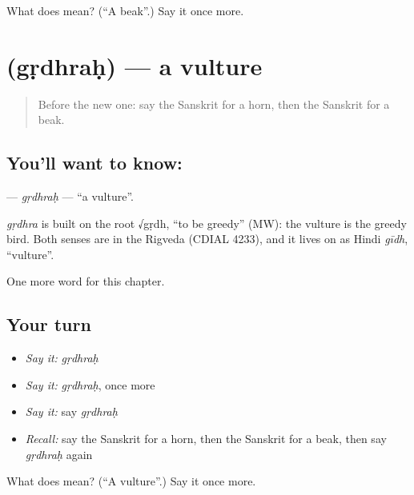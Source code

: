\begin{tcolorbox}[breakable,colback=teal!4,colframe=teal!35!black,title={Before you move on}]
What does  mean? (\textquotedblleft{}A beak\textquotedblright{}.) Say it once more.
\end{tcolorbox}
\section[\texorpdfstring{\sk{गृध्रः} (gṛdhraḥ)}{गृध्रः (gṛdhraḥ)}]{ (gṛdhraḥ) — a vulture}

\label{lesson:SA-C227-grdhrah}



\begin{quote}
Before the new one: say the Sanskrit for a horn, then the Sanskrit for a beak.
\end{quote}

\subsection*{You'll want to know: }
\textbf{} — \emph{gṛdhraḥ} — \textquotedblleft{}a vulture\textquotedblright{}.

\begin{cousinweb}
\emph{gṛdhra} is built on the root √gṛdh, \textquotedblleft{}to be greedy\textquotedblright{} (MW): the vulture is the greedy bird. Both senses are in the Rigveda (CDIAL 4233), and it lives on as Hindi \emph{gīdh}, \textquotedblleft{}vulture\textquotedblright{}.
\end{cousinweb}

\begin{grammarlens}[title={What you've built}]
One more word for this chapter.
\end{grammarlens}

\subsection*{Your turn}
\begin{itemize}
\raggedright
  \item \emph{Say it:} \emph{gṛdhraḥ}
  \item \emph{Say it:} \emph{gṛdhraḥ}, once more
  \item \emph{Say it:} say \emph{gṛdhraḥ}
  \item \emph{Recall:} say the Sanskrit for a horn, then the Sanskrit for a beak, then say \emph{gṛdhraḥ} again
\end{itemize}

\begin{tcolorbox}[breakable,colback=teal!4,colframe=teal!35!black,title={Before you move on}]
What does  mean? (\textquotedblleft{}A vulture\textquotedblright{}.) Say it once more.
\end{tcolorbox}
